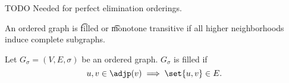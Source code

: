 

TODO
Needed for perfect elimination orderings.


An ordered graph is \t{filled} or \t{monotone transitive} if all higher neighborhoods induce complete subgraphs.


Let $G_{\sigma} = (V, E, \sigma)$ be an ordered graph.
$G_{\sigma}$ is filled if
$$
  u, v \in \adjp(v) \implies \set{u, v} \in E.
$$
